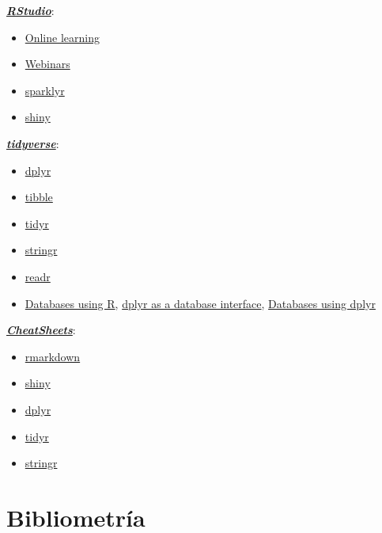\documentclass[]{book}
\begin{document}
\href{https://www.rstudio.com}{\textbf{\emph{RStudio}}}:

\begin{itemize}
\item
  \href{https://www.rstudio.com/online-learning}{Online learning}
\item
  \href{https://resources.rstudio.com/webinars}{Webinars}
\item
  \href{https://spark.rstudio.com/}{sparklyr}
\item
  \href{http://shiny.rstudio.com}{shiny}
\end{itemize}

\href{https://www.tidyverse.org/}{\textbf{\emph{tidyverse}}}:

\begin{itemize}
\item
  \href{https://dplyr.tidyverse.org}{dplyr}
\item
  \href{https://tibble.tidyverse.org}{tibble}
\item
  \href{https://tidyr.tidyverse.org}{tidyr}
\item
  \href{https://stringr.tidyverse.org}{stringr}
\item
  \href{https://readr.tidyverse.org}{readr}
\item
  \href{https://db.rstudio.com}{Databases using R},
  \href{https://db.rstudio.com/overview}{dplyr as a database interface},
  \href{https://db.rstudio.com/dplyr}{Databases using dplyr}
\end{itemize}

\href{https://resources.rstudio.com/rstudio-cheatsheets}{\textbf{\emph{CheatSheets}}}:

\begin{itemize}
\item
  \href{https://resources.rstudio.com/rstudio-cheatsheets/rmarkdown-2-0-cheat-sheet}{rmarkdown}
\item
  \href{https://resources.rstudio.com/rstudio-cheatsheets/shiny-cheat-sheet}{shiny}
\item
  \href{https://github.com/rstudio/cheatsheets/blob/master/data-transformation.pdf}{dplyr}
\item
  \href{https://github.com/rstudio/cheatsheets/blob/master/data-import.pdf}{tidyr}
\item
  \href{https://resources.rstudio.com/rstudio-cheatsheets/stringr-cheat-sheet}{stringr}
\end{itemize}

\hypertarget{bibliom-links}{%
\section{Bibliometría}\label{bibliom-links}}
\end{document}
